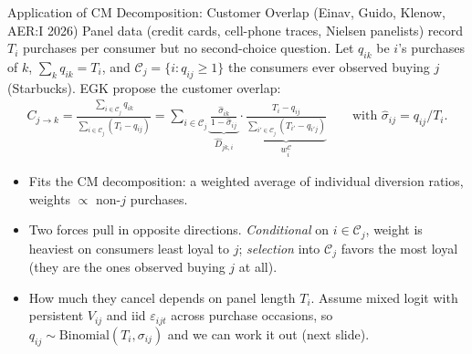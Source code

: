 \documentclass[aspectratio=169,10pt]{beamer}
\begin{document}
\begin{frame}{Application of CM Decomposition: Customer Overlap (Einav, Guido, Klenow, AER:I 2026)}
\small
Panel data (credit cards, cell-phone traces, Nielsen panelists) record $T_i$ purchases per consumer but no second-choice question. Let $q_{ik}$ be $i$'s purchases of $k$, $\sum_k q_{ik} = T_i$, and $\mathcal{C}_j = \{i : q_{ij} \geq 1\}$ the consumers \alert{ever observed buying} $j$ (Starbucks). EGK propose the \alert{customer overlap}:
\begin{align*}
C_{j \rightarrow k}
=\frac{\sum_{i \in \mathcal{C}_j} q_{ik}}{\sum_{i \in \mathcal{C}_j} (T_i - q_{ij})}
= \sum_{i \in \mathcal{C}_j} \underbrace{\frac{\hat{\sigma}_{ik}}{1-\hat{\sigma}_{ij}}}_{\hat{D}_{jk,i}} \cdot \underbrace{\frac{T_i - q_{ij}}{\sum_{i' \in \mathcal{C}_j} (T_{i'}-q_{i'j})}}_{w_i^{\mathcal{C}}}
\qquad \text{with } \hat{\sigma}_{ij} = q_{ij}/T_i.
\end{align*}
\begin{itemize}
    \item Fits the CM decomposition: a weighted average of \alert{individual diversion ratios}, weights $\propto$ non-$j$ purchases.
    \item Two forces pull in opposite directions. \emph{Conditional} on $i \in \mathcal{C}_j$, weight is heaviest on consumers \alert{least} loyal to $j$; \emph{selection} into $\mathcal{C}_j$ favors the \alert{most} loyal (they are the ones observed buying $j$ at all).
    \item How much they cancel depends on panel length $T_i$. Assume mixed logit with persistent $V_{ij}$ and iid $\varepsilon_{ijt}$ across purchase occasions, so $q_{ij} \sim \text{Binomial}(T_i, \sigma_{ij})$ and we can work it out (next slide).
\end{itemize}
\end{frame}
\end{document}
